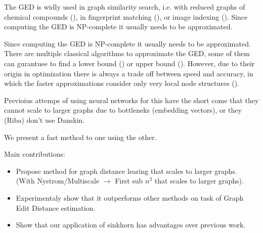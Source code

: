 The GED is widly used in graph similarity search, i.e. with reduced graphs of chemical compounds (\citealp{chem2006}), in fingerprint matching (\citealp{fingerprint2005}), or image indexing (\citealp{image_index2008}). Since computing the GED is NP-complete \cite{np_complete1998} it usually needs to be approximated.

Since computing the GED is NP-complete \cite{np_complete1998} it usually needs to be approximated. There are multiple classical algorithms to approximate the GED, some of them can gurantuee to find a lower bound (\cite{hungarian2009}) or upper bound (\citealp{hed2015}). However, due to their origin in optimization there is always a trade off between speed and accuracy, in which the faster approximations consider only very local node structures (\citealp{riba2018}).


Previoius attemps of using neural networks for this have the short come that they cannot scale to larger graphs due to bottleneks (embedding vectors), or they (Riba) don't use Danskin.

We present a fast method to one using the other.

Main contributions:
\begin{itemize}
    \itemsep0em
    \item Propose method for graph distance learing that scales to larger graphs. \\ (With Nystrom/Multiscale $\rightarrow$ First sub $n^2$ that scales to larger graphs).
    \item Experimentaly show that it outperforms other methods on task of Graph Edit Distance estimation.
    \item Show that our application of sinkhorn has advantages over previous work.
\end{itemize}
